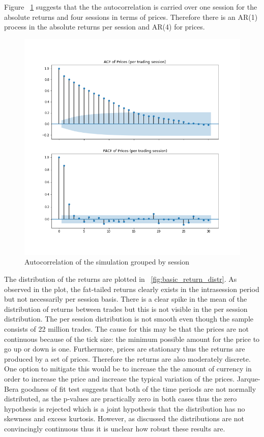 Figure ~\ref{fig:basic_autocorr_per_session} suggests that the the autocorrelation is carried over one
session for the absolute returns and four sessions in terms of prices. Therefore there is an AR(1) 
process in the absolute returns per session and AR(4) for prices. 

\begin{figure}
    \includegraphics[width=\linewidth]{plots/basic_autocorrelation.png}
    \caption{Autocorrelation of the simulation grouped by session}
    \label{fig:basic_autocorr_per_session}
\end{figure}



The distribution of the returns are plotted in ~\ref{fig:basic_return_distr}. As observed in the plot, the fat-tailed returns
clearly exists in the intrasession period but not necessarily per session basis. There is a clear spike in the mean of the 
distribution of returns between trades but this is not visible in the per session distribution. The per session distribution
is not smooth even though the sample consists of 22 million trades. The cause for this may be that the prices are not 
continuous because of the tick size: the minimum possible amount for the price to go up or down is one. Furthermore, prices are
stationary thus the returns are produced by a set of prices. Therefore the returns are also moderately discrete. One option
to mitigate this would be to increase the the amount of currency in order to increase the price and increase the typical
variation of the prices. Jarque-Bera goodness of fit test suggests that both of the time periods are not normally distributed,
as the p-values are practically zero in both cases thus the zero hypothesis is rejected which is a joint hypothesis that the
distribution has no skewness and excess kurtosis. However, as discussed the distributions are not convincingly continuous thus
it is unclear how robust these results are.


